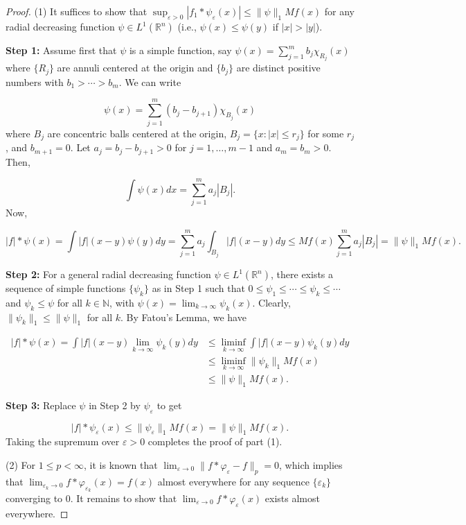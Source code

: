 \begin{proof}
    


(1) It suffices to show that $\sup_{\varepsilon>0}|f_1 * \psi_{\varepsilon}(x)| \leqslant \|\psi\|_1 Mf(x)$ for any radial decreasing function $\psi \in L^1(\mathbb{R}^n)$ (i.e., $\psi(x) \leqslant \psi(y)$ if $|x| > |y|$).

\textbf{Step 1:} Assume first that $\psi$ is a simple function, say $\psi(x)=\sum_{j=1}^m b_j \chi_{R_j}(x)$ where $\{R_j\}$ are annuli centered at the origin and $\{b_j\}$ are distinct positive numbers with $b_1 > \cdots > b_m$. We can write

$$\psi(x) = \sum_{j=1}^m (b_j - b_{j+1}) \chi_{B_j}(x)$$where $B_j$ are concentric balls centered at the origin, $B_j = \{x: |x| \leqslant r_j\}$ for some $r_j$, and $b_{m+1}=0$. Let $a_j = b_j - b_{j+1} > 0$ for $j=1,\ldots,m-1$ and $a_m = b_m > 0$. Then,

$$\int \psi(x) dx = \sum_{j=1}^m a_j |B_j|.$$Now,

$$|f| * \psi(x) = \int |f|(x-y) \psi(y) dy = \sum_{j=1}^m a_j \int_{B_j} |f|(x-y) dy \leqslant Mf(x) \sum_{j=1}^m a_j |B_j| = \|\psi\|_1 Mf(x).$$

\textbf{Step 2:} For a general radial decreasing function $\psi \in L^1(\mathbb{R}^n)$, there exists a sequence of simple functions $\{\psi_k\}$ as in Step 1 such that $0 \leqslant \psi_1 \leqslant \cdots \leqslant \psi_k \leqslant \cdots$ and $\psi_k \leqslant \psi$ for all $k \in \mathbb{N}$, with $\psi(x) = \lim_{k \rightarrow \infty} \psi_k(x)$. Clearly, $\|\psi_k\|_1 \leqslant \|\psi\|_1$ for all $k$. By Fatou's Lemma, we have

$$\begin{aligned}
    |f| * \psi(x) = \int |f|(x-y) \lim_{k \rightarrow \infty} \psi_k(y) dy &\leqslant \liminf_{k \rightarrow \infty} \int |f|(x-y) \psi_k(y) dy \\
    &\leqslant \liminf_{k \rightarrow \infty} \|\psi_k\|_1 Mf(x)\\
    &\leqslant \|\psi\|_1 Mf(x).
\end{aligned}$$

\textbf{Step 3:} Replace $\psi$ in Step 2 by $\psi_{\varepsilon}$ to get

$$|f| * \psi_{\varepsilon}(x) \leqslant \|\psi_{\varepsilon}\|_1 Mf(x) = \|\psi\|_1 Mf(x).$$Taking the supremum over $\varepsilon > 0$ completes the proof of part (1).

(2) For $1 \leqslant p < \infty$, it is known that $\lim_{\varepsilon \rightarrow 0} \|f * \varphi_{\varepsilon} - f\|_p = 0$, which implies that $\lim_{\varepsilon_k \rightarrow 0} f * \varphi_{\varepsilon_k}(x) = f(x)$ almost everywhere for any sequence $\{\varepsilon_k\}$ converging to 0. It remains to show that $\lim_{\varepsilon \rightarrow 0} f * \varphi_{\varepsilon}(x)$ exists almost everywhere.


\end{proof}
